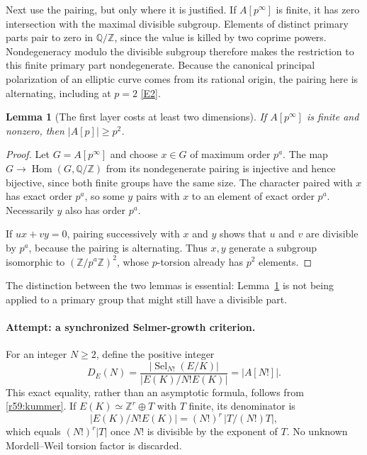 \documentclass[11pt,a4paper]{article}
\newcommand{\Z}{\mathbb{Z}}
\newcommand{\Q}{\mathbb{Q}}
\newcommand{\eref}[2]{\hyperlink{extra:#1:#2}{[E#2]}}
\newtheorem{notebooklemma}{Lemma}[section]
\numberwithin{equation}{section}
\begin{document}
Next use the pairing, but only where it is justified. If $A[p^\infty]$ is finite, it has zero intersection with the maximal divisible subgroup. Elements of distinct primary parts pair to zero in $\Q/\Z$, since the value is killed by two coprime powers. Nondegeneracy modulo the divisible subgroup therefore makes the restriction to this finite primary part nondegenerate. Because the canonical principal polarization of an elliptic curve comes from its rational origin, the pairing here is alternating, including at $p=2$ \eref{59}{2}.

\begin{notebooklemma}[The first layer costs at least two dimensions]\label{r59:two}
If $A[p^\infty]$ is finite and nonzero, then $|A[p]|\geq p^2$.
\end{notebooklemma}
\begin{proof}
Let $G=A[p^\infty]$ and choose $x\in G$ of maximum order $p^a$. The map $G\to\operatorname{Hom}(G,\Q/\Z)$ from its nondegenerate pairing is injective and hence bijective, since both finite groups have the same size. The character paired with $x$ has exact order $p^a$, so some $y$ pairs with $x$ to an element of exact order $p^a$. Necessarily $y$ also has order $p^a$.

If $ux+vy=0$, pairing successively with $x$ and $y$ shows that $u$ and $v$ are divisible by $p^a$, because the pairing is alternating. Thus $x,y$ generate a subgroup isomorphic to $(\Z/p^a\Z)^2$, whose $p$-torsion already has $p^2$ elements.
\end{proof}
The distinction between the two lemmas is essential: Lemma~\ref{r59:two} is not being applied to a primary group that might still have a divisible part.

\paragraph{Attempt: a synchronized Selmer-growth criterion.}
For an integer $N\geq2$, define the positive integer
\begin{equation}\label{r59:defect}
 D_E(N)=\frac{|\operatorname{Sel}_{N!}(E/K)|}
                   {|E(K)/N!E(K)|}=|A[N!]|.
\end{equation}
This exact equality, rather than an asymptotic formula, follows from \eqref{r59:kummer}. If $E(K)\simeq\Z^r\oplus T$ with $T$ finite, its denominator is
\[
 |E(K)/N!E(K)|=(N!)^r\,|T/(N!)T|,
\]
which equals $(N!)^r|T|$ once $N!$ is divisible by the exponent of $T$. No unknown Mordell--Weil torsion factor is discarded.
\end{document}
